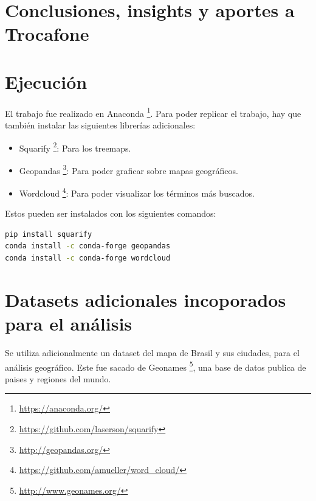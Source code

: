 \documentclass[a4paper]{article}
\begin{document}
\section{Conclusiones, insights y aportes a Trocafone}



\newpage
\appendix

\section{Ejecución}

El trabajo fue realizado en Anaconda \footnote{\url{https://anaconda.org/}}. Para poder replicar el trabajo, hay que también instalar las siguientes librerías adicionales:

\begin{itemize}
	\item{Squarify \footnote{\url{https://github.com/laserson/squarify}}: Para los treemaps.}
	\item{Geopandas \footnote{\url{http://geopandas.org/}}: Para poder graficar sobre mapas geográficos.}
	\item{Wordcloud \footnote{\url{https://github.com/amueller/word_cloud/}}: Para poder visualizar los términos más buscados.}
\end{itemize}

Estos pueden ser instalados con los siguientes comandos: 
\begin{lstlisting}[language=sh]
pip install squarify
conda install -c conda-forge geopandas
conda install -c conda-forge wordcloud
\end{lstlisting}

\section{Datasets adicionales incoporados para el análisis}

Se utiliza adicionalmente un dataset del mapa de Brasil y sus ciudades, para el análisis geográfico. Este fue sacado de  Geonames \footnote{\url{http://www.geonames.org/}}, una base de datos publica de paises y regiones del mundo.
\end{document}
